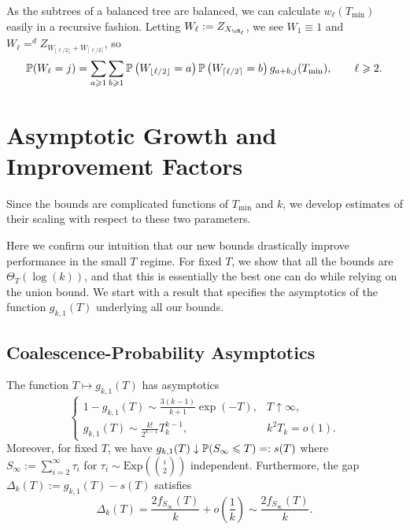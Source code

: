 \noindent As the subtrees of a balanced tree are balanced, we can calculate $w_\ell(T_{\mathrm{min}})$ easily
in a recursive fashion. Letting $W_\ell := Z_{X_{\cB_\ell}}$, we see $W_1 \equiv 1$ and
$W_\ell =^d Z_{W_{\lfloor \ell/2 \rfloor} + W_{\lceil \ell/2 \rceil}}$, so
%
\begin{equation}
    \P(W_\ell=j)
    =
    \sum_{a\geq 1}\sum_{b\geq 1}
    \P\left(W_{\lfloor\ell/2\rfloor}=a\right)
    \P\left(W_{\lceil\ell/2\rceil}=b\right)
    g_{a+b,j}(T_{\mathrm{min}}),
    \qquad \ell\geq 2.
    \label{eqn:balanced-W-recursion}
\end{equation}

\section{Asymptotic Growth and Improvement Factors}
\label{sec:asymptotic-growth}

 Since the bounds are complicated functions of $T_{\mathrm{min}}$ and $k$, we develop estimates
 of their scaling with respect to these two parameters.

 Here we confirm our intuition that our new bounds drastically improve performance
 in the small $T$ regime. For fixed $T$, we show that all the bounds are $\Theta_T(\log(k))$, and that
 this is essentially the best one can do while relying on the union bound. We start with a
 result that specifies the asymptotics of the function $g_{k,1}(T)$ underlying all our bounds.

\subsection{Coalescence-Probability Asymptotics}
\label{sec:coalescence-probability-asymptotics}

\begin{lemma}[Asymptotics of $g_{k,1}(T)$]
\label{lem:asymptotics_g_k1(T)}
The function $T \mapsto g_{k,1}(T)$ has asymptotics
\begin{equation}
     \begin{cases} 1 - g_{k,1}(T) \sim \frac{3(k-1)}{k+1} \exp(-T), & T \uparrow \infty, \\
 g_{k,1}(T) \sim \frac{k!}{2^{k-1}} T_k^{k-1}, &  k^2T_k = o(1).
\end{cases}
\label{eqn:asymptotics_T_mapsto_g_k1(T)}
\end{equation}
\noindent Moreover, for fixed $T$, we have $g_{k,1}(T) \downarrow \P(S_\infty \leq T) =: s(T)$ where $S_\infty := \sum_{i=2}^\infty \tau_i$ for $\tau_i \sim \mathrm{Exp}\left(\binom{i}{2}\right)$ independent. Furthermore, the gap $\Delta_k(T) := g_{k,1}(T) - s(T)$ satisfies
%
\[\Delta_k(T) = \frac{2f_{S_\infty}(T)}{k} + o\left(\frac{1}{k}\right) \sim \frac{2f_{S_\infty}(T)}{k}.\]
%
\end{lemma}

